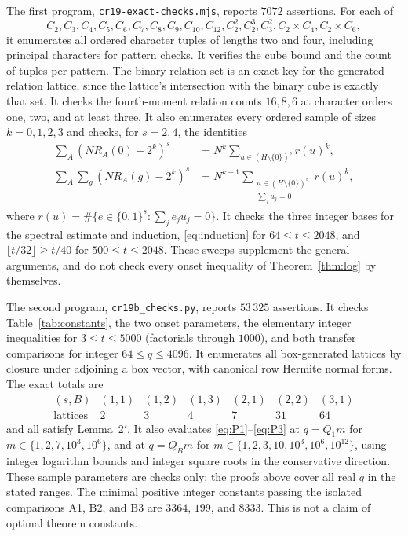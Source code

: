 \documentclass[11pt]{amsart}
\theoremstyle{remark}
\newcommand{\QB}{Q_B}
\begin{document}
The first program, \texttt{cr19-exact-checks.mjs}, reports $7072$
assertions. For each of
\[
 C_2,C_3,C_4,C_5,C_6,C_7,C_8,C_9,C_{10},C_{12},
 C_2^2,C_2^3,C_3^2,C_2\times C_4,C_2\times C_6,
\]
it enumerates all ordered character tuples of lengths two and four,
including principal characters for pattern checks. It verifies the
cube bound and the count of tuples per pattern. The binary relation
set is an exact key for the generated relation lattice, since the
lattice's intersection with the binary cube is exactly that set.
It checks the fourth-moment relation counts $16,8,6$ at character
orders one, two, and at least three. It also enumerates every ordered
sample of sizes $k=0,1,2,3$ and checks, for $s=2,4$, the identities
\begin{align*}
 \sum_A(NR_A(0)-2^k)^s
   &=N^k\sum_{u\in(H\setminus\{0\})^s}r(u)^k,\\
 \sum_A\sum_g(NR_A(g)-2^k)^s
   &=N^{k+1}\sum_{\substack{u\in(H\setminus\{0\})^s\\\sum_ju_j=0}}r(u)^k,
\end{align*}
where $r(u)=\#\{e\in\{0,1\}^s:\sum_je_ju_j=0\}$.
It checks the three integer bases for the spectral estimate and
induction, \eqref{eq:induction} for $64\le t\le2048$, and
$\lfloor t/32\rfloor\ge t/40$ for $500\le t\le2048$.
These sweeps supplement the general arguments, and do not check
every onset inequality of Theorem~\ref{thm:log} by themselves.

The second program, \texttt{cr19b\_checks.py}, reports $53\,325$
assertions. It checks Table~\ref{tab:constants}, the two onset
parameters, the elementary integer inequalities for $3\le t\le5000$
(factorials through $1000$), and both transfer comparisons for integer
$64\le q\le4096$. It enumerates all box-generated lattices by
closure under adjoining a box vector, with canonical row Hermite
normal forms. The exact totals are
\[
\begin{array}{c|rrrrrr}
 (s,B)&(1,1)&(1,2)&(1,3)&(2,1)&(2,2)&(3,1)\\\hline
 \text{lattices}&2&3&4&7&31&64
\end{array}
\]
and all satisfy Lemma~2$'$. It also evaluates
\eqref{eq:P1}--\eqref{eq:P3} at $q=Q_1m$ for
$m\in\{1,2,7,10^3,10^6\}$, and at $q=\QB m$ for
$m\in\{1,2,3,10,10^3,10^6,10^{12}\}$, using integer logarithm
bounds and integer square roots in the conservative direction. These
sample parameters are checks only; the proofs above cover all real
$q$ in the stated ranges. The minimal positive integer constants
passing the isolated comparisons A1, B2, and B3 are $3364$, $199$,
and $8333$. This is not a claim of optimal theorem constants.
\end{document}
